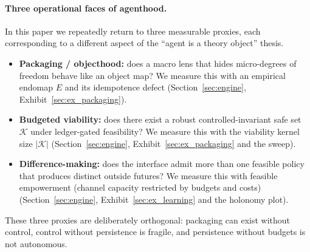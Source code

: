 \documentclass[11pt]{article}
\newcommand{\K}{\mathcal{K}}
\begin{document}
\paragraph{Three operational faces of agenthood.}
In this paper we repeatedly return to three measurable proxies, each corresponding to a different aspect of the ``agent is a theory object'' thesis.
\begin{itemize}[leftmargin=*, itemsep=0.25em]
  \item \textbf{Packaging / objecthood:} does a macro lens that hides micro-degrees of freedom behave like an object map? We measure this with an empirical endomap $E$ and its idempotence defect (Section~\ref{sec:engine}, Exhibit~\ref{sec:ex_packaging}).
  \item \textbf{Budgeted viability:} does there exist a robust controlled-invariant safe set $\K$ under ledger-gated feasibility? We measure this with the viability kernel size $|\K|$ (Section~\ref{sec:engine}, Exhibit~\ref{sec:ex_packaging} and the sweep).
  \item \textbf{Difference-making:} does the interface admit more than one feasible policy that produces distinct outside futures? We measure this with feasible empowerment (channel capacity restricted by budgets and costs) (Section~\ref{sec:engine}, Exhibit~\ref{sec:ex_learning} and the holonomy plot).
\end{itemize}
These three proxies are deliberately orthogonal: packaging can exist without control, control without persistence is fragile, and persistence without budgets is not autonomous.
\end{document}

